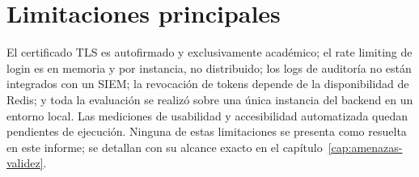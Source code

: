 \section*{Limitaciones principales}
El certificado TLS es autofirmado y exclusivamente acad\'emico; el rate
limiting de login es en memoria y por instancia, no distribuido; los logs
de auditor\'ia no est\'an integrados con un SIEM; la revocaci\'on de tokens
depende de la disponibilidad de Redis; y toda la evaluaci\'on se realiz\'o
sobre una \'unica instancia del backend en un entorno local. Las mediciones
de usabilidad y accesibilidad automatizada quedan pendientes de ejecuci\'on.
Ninguna de estas limitaciones se presenta como resuelta en este informe; se
detallan con su alcance exacto en el cap\'itulo~\ref{cap:amenazas-validez}.

